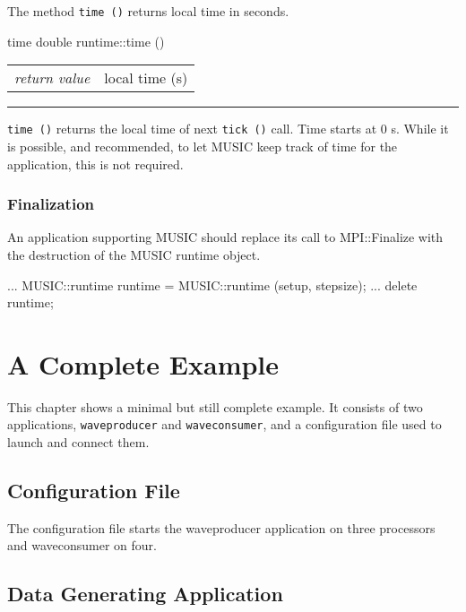 \documentclass[a4paper]{report}
\makeatletter
\newenvironment{parameters}%
{\begin{tabular}{@{\hspace{2em}}lp{0.6\textwidth}}}%
{\end{tabular}\par\vspace{1mm}\par\hrule\par\vspace{5mm}}
\makeatother
\begin{document}
The method \lstinline|time ()| returns local time in seconds.

\begin{head}{time}
  double runtime::time ()
\end{head}
\begin{parameters}
  \emph{return value} & local time (s) \\
\end{parameters}

\lstinline|time ()| returns the local time of next \lstinline|tick ()|
call.  Time starts at 0 s.  While it is possible, and recommended, to
let MUSIC keep track of time for the application, this is not
required.

\subsection{Finalization}

An application supporting MUSIC should replace its call to
MPI::Finalize with the destruction of the MUSIC runtime object.

\begin{code}{}
  ...
  MUSIC::runtime runtime = MUSIC::runtime (setup, stepsize);
  ...
  delete runtime;
\end{code}

\chapter{A Complete Example}

This chapter shows a minimal but still complete example.  It consists
of two applications, \texttt{waveproducer} and \texttt{waveconsumer},
and a configuration file used to launch and connect them.


\section{Configuration File}
\label{sec:conffile}

The configuration file starts the waveproducer application on three
processors and waveconsumer on four.




\section{Data Generating Application}
\end{document}
